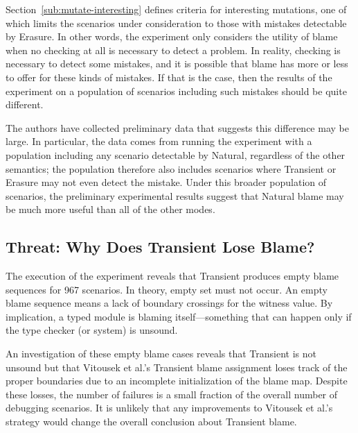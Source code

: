 Section~\ref{sub:mutate-interesting} defines criteria for interesting mutations,
one of which limits the scenarios under consideration to those with mistakes
detectable by Erasure. In other words, the experiment only considers the utility
of blame when no checking at all is necessary to detect a problem. In reality,
checking is necessary to detect some mistakes, and it is possible that blame has
more or less to offer for these kinds of mistakes. If that is the case, then the
results of the experiment on a population of scenarios including such mistakes
should be quite different.

The authors have collected preliminary data that suggests this difference may be
large. In particular, the data comes from running the experiment with a
population including any scenario detectable by Natural, regardless of the other
semantics; the population therefore also includes scenarios where Transient or
Erasure may not even detect the mistake.
Under this broader population of scenarios, the preliminary experimental results
suggest that Natural blame may be much more useful than all of the other modes.

\subsection{Threat: Why Does Transient Lose Blame?} \label{sec:threat:transient}

The execution of the experiment reveals that Transient produces empty blame
sequences for 967 scenarios. In theory, empty set must not occur. An empty blame
sequence means a lack of boundary crossings for the witness value.  By
implication, a typed module is blaming itself---something that can happen only
if the type checker (or system) is unsound.

An investigation of these empty blame cases reveals that Transient is not
unsound but that Vitousek et al.'s Transient blame assignment loses track
of the proper boundaries due to an incomplete initialization of the blame map.
Despite these losses, the number of failures is a small fraction of the
overall number of debugging scenarios. It is unlikely that any
improvements to Vitousek et al.'s strategy would change the overall
conclusion about Transient blame.

